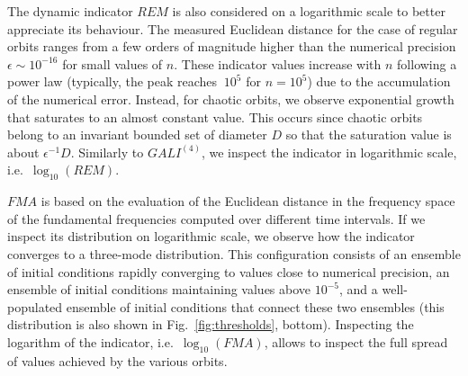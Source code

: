 \begin{chapterappendices}
The dynamic indicator $REM$ is also considered on a logarithmic scale to better appreciate its behaviour. The measured Euclidean distance for the case of regular orbits ranges from a few orders of magnitude higher than the numerical precision $\epsilon\sim 10^{-16}$ for small values of $n$. These indicator values increase with $n$ following a power law (typically, the peak reaches $~10^{5}$ for $n=10^5$) due to the accumulation of the numerical error. Instead, for chaotic orbits, we observe exponential growth that saturates to an almost constant value. This occurs since chaotic orbits belong to an invariant bounded set of diameter $D$ so that the saturation value is about $\epsilon^{-1} D$. %
Similarly to $GALI^{(4)}$, we inspect the indicator in logarithmic scale, i.e.~$\log_{10}(REM)$. 

$FMA$ is based on the evaluation of the Euclidean distance in the frequency space of the fundamental frequencies computed over different time intervals. If we inspect its distribution on logarithmic scale, we observe how the indicator converges to a three-mode distribution. This configuration consists of an ensemble of initial conditions rapidly converging to values close to numerical precision, an ensemble of initial conditions maintaining values above $10^{-5}$, and a well-populated ensemble of initial conditions that connect these two ensembles (this distribution is also shown in Fig.~\ref{fig:thresholds}, bottom). Inspecting the logarithm of the indicator, i.e.~$\log_{10}(FMA)$, allows to inspect the full spread of values achieved by the various orbits.

\end{chapterappendices}